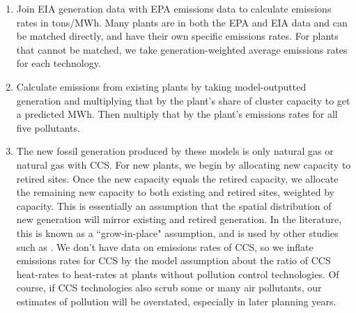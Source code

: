 \documentclass[a4paper]{article}
\theoremstyle{definition}
\theoremstyle{plain}
\begin{document}
\begin{enumerate}
    \item Join EIA generation data with EPA emissions data to calculate emissions rates in tons/MWh.  Many plants are in both the EPA and EIA data and can be matched directly, and have their own specific emissions rates.  For plants that cannot be matched, we take generation-weighted average emissions rates for each technology.
    \item Calculate emissions from existing plants by taking model-outputted generation and multiplying that by the plant's share of cluster capacity to get a predicted MWh.  Then multiply that by the plant's emissions rates for all five pollutants.
    \item The new fossil generation produced by these models is only natural gas or natural gas with CCS.  For new plants, we begin by allocating new capacity to retired sites.  Once the new capacity equals the retired capacity, we allocate the remaining new capacity to both existing and retired sites, weighted by capacity.  This is essentially an assumption that the spatial distribution of new generation will mirror existing and retired generation. In the literature, this is known as a ``grow-in-place" assumption, and is used by other studies such as \citet{Jordan2024ClimateGeneration}.  We don't have data on emissions rates of CCS, so we inflate emissions rates for CCS by the model assumption about the ratio of CCS heat-rates to heat-rates at plants without pollution control technologies.  Of course, if CCS technologies also scrub some or many air pollutants, our estimates of pollution will be overstated, especially in later planning years. 
\end{enumerate}
\end{document}
